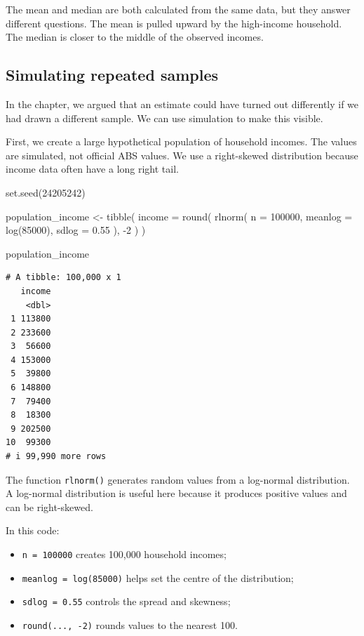\documentclass[
  letterpaper,
  DIV=11,
  numbers=noendperiod]{scrreprt}
\newenvironment{Shaded}{\begin{snugshade}}{\end{snugshade}}
\newcommand{\AttributeTok}[1]{\textcolor[rgb]{0.40,0.45,0.13}{#1}}
\newcommand{\DecValTok}[1]{\textcolor[rgb]{0.68,0.00,0.00}{#1}}
\newcommand{\FloatTok}[1]{\textcolor[rgb]{0.68,0.00,0.00}{#1}}
\newcommand{\FunctionTok}[1]{\textcolor[rgb]{0.28,0.35,0.67}{#1}}
\newcommand{\NormalTok}[1]{\textcolor[rgb]{0.00,0.23,0.31}{#1}}
\newcommand{\OtherTok}[1]{\textcolor[rgb]{0.00,0.23,0.31}{#1}}
\newcommand{\SpecialCharTok}[1]{\textcolor[rgb]{0.37,0.37,0.37}{#1}}
\providecommand{\tightlist}{%
  \setlength{\itemsep}{0pt}\setlength{\parskip}{0pt}}
\begin{document}
The mean and median are both calculated from the same data, but they
answer different questions. The mean is pulled upward by the high-income
household. The median is closer to the middle of the observed incomes.

\subsection{Simulating repeated
samples}\label{simulating-repeated-samples}

In the chapter, we argued that an estimate could have turned out
differently if we had drawn a different sample. We can use simulation to
make this visible.

First, we create a large hypothetical population of household incomes.
The values are simulated, not official ABS values. We use a right-skewed
distribution because income data often have a long right tail.

\begin{Shaded}
\begin{Highlighting}[]
\FunctionTok{set.seed}\NormalTok{(}\DecValTok{24205242}\NormalTok{)}

\NormalTok{population\_income }\OtherTok{\textless{}{-}} \FunctionTok{tibble}\NormalTok{(}
  \AttributeTok{income =} \FunctionTok{round}\NormalTok{(}
    \FunctionTok{rlnorm}\NormalTok{(}
      \AttributeTok{n =} \DecValTok{100000}\NormalTok{,}
      \AttributeTok{meanlog =} \FunctionTok{log}\NormalTok{(}\DecValTok{85000}\NormalTok{),}
      \AttributeTok{sdlog =} \FloatTok{0.55}
\NormalTok{    ),}
    \SpecialCharTok{{-}}\DecValTok{2}
\NormalTok{  )}
\NormalTok{)}

\NormalTok{population\_income}
\end{Highlighting}
\end{Shaded}

\begin{verbatim}
# A tibble: 100,000 x 1
   income
    <dbl>
 1 113800
 2 233600
 3  56600
 4 153000
 5  39800
 6 148800
 7  79400
 8  18300
 9 202500
10  99300
# i 99,990 more rows
\end{verbatim}

The function \texttt{rlnorm()} generates random values from a log-normal
distribution. A log-normal distribution is useful here because it
produces positive values and can be right-skewed.

In this code:

\begin{itemize}
\tightlist
\item
  \texttt{n\ =\ 100000} creates 100,000 household incomes;
\item
  \texttt{meanlog\ =\ log(85000)} helps set the centre of the
  distribution;
\item
  \texttt{sdlog\ =\ 0.55} controls the spread and skewness;
\item
  \texttt{round(...,\ -2)} rounds values to the nearest 100.
\end{itemize}
\end{document}
